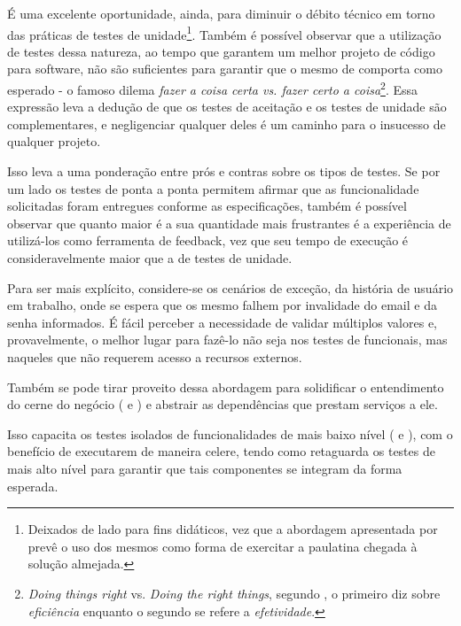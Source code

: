   É uma excelente oportunidade, ainda, para diminuir o débito técnico em torno das práticas de testes de unidade\footnote{Deixados de lado para fins didáticos, vez que a abordagem apresentada por  prevê o uso dos mesmos como forma de exercitar a paulatina chegada à solução almejada.}. Também é possível observar que a utilização de testes dessa natureza, ao tempo que garantem um melhor projeto de código para software, não são suficientes para garantir que o mesmo de comporta como esperado - o famoso dilema \emph{fazer a coisa certa vs. fazer certo a coisa}\footnote{\emph{Doing things right} vs. \emph{Doing the right things}, segundo , o primeiro diz sobre \emph{eficiência} enquanto o segundo se refere a \emph{efetividade}.}. Essa expressão leva a dedução de que os testes de aceitação e os testes de unidade são complementares, e negligenciar qualquer deles é um caminho para o insucesso de qualquer projeto.

  Isso leva a uma ponderação entre prós e contras sobre os tipos de testes. Se por um lado os testes de ponta a ponta permitem afirmar que as funcionalidade solicitadas foram entregues conforme as especificações, também é possível observar que quanto maior é a sua quantidade mais frustrantes é a experiência de utilizá-los como ferramenta de feedback, vez que seu tempo de execução é consideravelmente maior que a de testes de unidade.

  Para ser mais explícito, considere-se os cenários de exceção, da história de usuário em trabalho, onde se espera que os mesmo falhem por invalidade do email e da senha informados. É fácil perceber a necessidade de validar múltiplos valores e, provavelmente, o melhor lugar para fazê-lo não seja nos testes de funcionais, mas naqueles que não requerem acesso a recursos externos.

  Também se pode tirar proveito dessa abordagem para solidificar o entendimento do cerne do negócio ( e ) e abstrair as dependências que prestam serviços a ele.

  Isso capacita os testes isolados de funcionalidades de mais baixo nível ( e ), com o benefício de executarem de maneira celere, tendo como retaguarda os testes de mais alto nível para garantir que tais componentes se integram da forma esperada.

